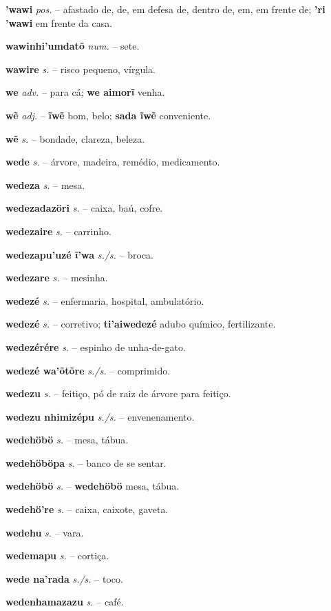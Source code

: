 \textbf{'wawi} \textit{pos.} -- afastado de, de, em defesa de, dentro de, em, em frente de; \textbf{'ri 'wawi} em frente da casa.

\textbf{wawinhi'umdatõ} \textit{num.} -- sete.

\textbf{wawire} \textit{s.} -- risco pequeno, vírgula.

\textbf{we} \textit{adv.} -- para cá; \textbf{we aimorĩ} venha.

\textbf{wẽ} \textit{adj.} -- \textbf{ĩwẽ} bom, belo; \textbf{sada ĩwẽ} conveniente.

\textbf{wẽ} \textit{s.} -- bondade, clareza, beleza.

\textbf{wede} \textit{s.} -- árvore, madeira, remédio, medicamento.

\textbf{wedeza} \textit{s.} -- mesa.

\textbf{wedezadazöri} \textit{s.} -- caixa, baú, cofre.

\textbf{wedezaire} \textit{s.} -- carrinho.

\textbf{wedezapu'uzé ĩ'wa} \textit{s./s.} -- broca.

\textbf{wedezare} \textit{s.} -- mesinha.

\textbf{wedezé} \textit{s.} -- enfermaria, hospital, ambulatório.

\textbf{wedezé} \textit{s.} -- corretivo; \textbf{ti'aiwedezé} adubo químico, fertilizante.

\textbf{wedezérére} \textit{s.} -- espinho de unha-de-gato.

\textbf{wedezé wa'õtõre} \textit{s./s.} -- comprimido.

\textbf{wedezu} \textit{s.} -- feitiço, pó de raiz de árvore para feitiço.

\textbf{wedezu nhimizépu} \textit{s./s.} -- envenenamento.

\textbf{wedehöbö} \textit{s.} -- mesa, tábua.

\textbf{wedehöböpa} \textit{s.} -- banco de se sentar.

\textbf{wedehöbö} \textit{s.} -- \textbf{wedehöbö} mesa, tábua.

\textbf{wedehö're} \textit{s.} -- caixa, caixote, gaveta.

\textbf{wedehu} \textit{s.} -- vara.

\textbf{wedemapu} \textit{s.} -- cortiça.

\textbf{wede na'rada} \textit{s./s.} -- toco.

\textbf{wedenhamazazu} \textit{s.} -- café.

